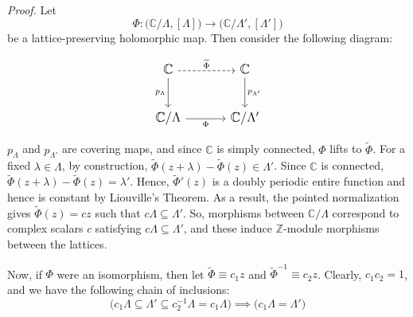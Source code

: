 \documentclass[11pt,a4paper]{article}
\begin{document}
\textit{Proof.}
Let
$$\Phi: \big(\mathbb{C}/\Lambda, [\Lambda]\big) \rightarrow \big(\mathbb{C}/\Lambda', [\Lambda']\big)$$
be a lattice-preserving holomorphic map. Then consider the following diagram:

\[\begin{tikzcd}[row sep=large,column sep=large,cells={nodes={font=\large}}]
	{\mathbb{C}} & {\mathbb{C}} \\
	{\mathbb{C}/\Lambda} & {\mathbb{C}/\Lambda'}
	\arrow["{p_{\Lambda}}"', from=1-1, to=2-1]
	\arrow["{\widetilde{\Phi}}", dashed, from=1-1, to=1-2]
	\arrow["{p_{\Lambda'}}", from=1-2, to=2-2]
	\arrow["\Phi"', from=2-1, to=2-2]
\end{tikzcd}\]

$p_{\Lambda}$ and $p_{\Lambda'}$ are covering maps, and since $\mathbb C$ is simply connected, $\Phi$ lifts to $\widetilde\Phi$. For a fixed $\lambda \in \Lambda$, by construction, $\widetilde{\Phi}(z+\lambda) - \widetilde{\Phi}(z) \in \Lambda'$. Since $\mathbb{C}$ is connected, $\widetilde{\Phi}(z+\lambda) - \widetilde{\Phi}(z) = \lambda'$. Hence, $\widetilde\Phi'(z)$ is a doubly periodic entire function and hence is constant by Liouville's Theorem. As a result, the pointed normalization gives $\widetilde{\Phi}(z) = cz$ such that $c\Lambda \subseteq \Lambda'$. So, morphisms between $\mathbb{C}/\Lambda$ correspond to complex scalars $c$ satisfying $c\Lambda\subseteq\Lambda'$, and these induce $\mathbb Z$-module morphisms between the lattices.

Now, if $\Phi$ were an isomorphism, then let $\widetilde{\Phi} \equiv c_1z$ and $\widetilde{\Phi}^{-1} \equiv c_2z$. Clearly, $c_1c_2 = 1$, and we have the following chain of inclusions:
$$\big(c_1\Lambda \subseteq \Lambda' \subseteq c_2^{-1}\Lambda = c_1\Lambda\big) \implies \big(c_1\Lambda = \Lambda'\big)$$
\end{document}

